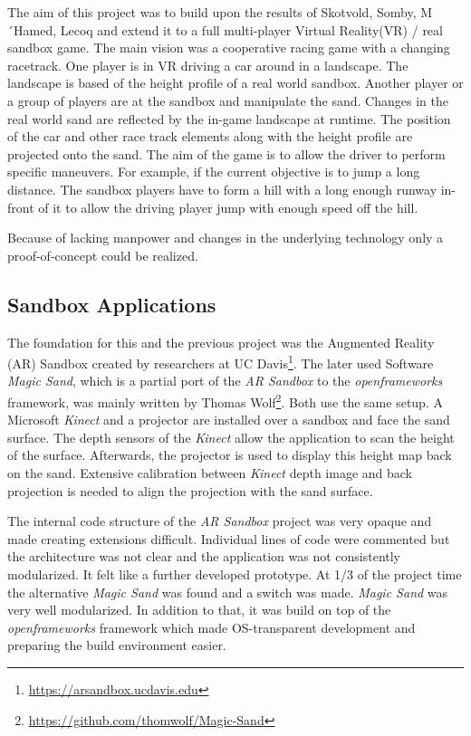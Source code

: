 \documentclass[12pt,a4paper,twoside,titlepage,headsepline,numbers=noenddot,listof=totoc,index=totoc,bibliography=totoc]{scrartcl}
\theoremstyle{break}
\begin{document}
The aim of this project was to build upon the results of Skotvold, Somby, M´Hamed, Lecoq and extend it to a full multi-player Virtual Reality(VR) / real sandbox game. The main vision was a cooperative racing game with a changing racetrack. One player is in VR driving a car around in a landscape. The landscape is based of the height profile of a real world sandbox. Another player or a group of players are at the sandbox and manipulate the sand. Changes in the real world sand are reflected by the in-game landscape at runtime. The position of the car and other race track elements along with the height profile are projected onto the sand. The aim of the game is to allow the driver to perform specific maneuvers. For example, if the current objective is to jump a long distance. The sandbox players have to form a hill with a long enough runway in-front of it to allow the driving player jump with enough speed off the hill.  

Because of lacking manpower and changes in the underlying technology only a proof-of-concept could be realized.

\subsection{Sandbox Applications}
The foundation for this and the previous project was the Augmented Reality (AR) Sandbox created by researchers at UC Davis\footnote{\url{https://arsandbox.ucdavis.edu}}. The later used Software \textit{Magic Sand}, which is a partial port of the \textit{AR Sandbox} to the \textit{openframeworks} framework, was mainly written by Thomas Wolf\footnote{\url{https://github.com/thomwolf/Magic-Sand}}. Both use the same setup. A Microsoft \textit{Kinect} and a projector are installed over a sandbox and face the sand surface. The depth sensors of the \textit{Kinect} allow the application to scan the height of the surface. Afterwards, the projector is used to display this height map back on the sand. Extensive calibration between \textit{Kinect} depth image and back projection is needed to align the projection with the sand surface. 

The internal code structure of the \textit{AR Sandbox} project was very opaque and made creating extensions difficult. Individual lines of code were commented but the architecture was not clear and the application was not consistently modularized. It felt like a further developed prototype. At 1/3 of the project time the alternative \textit{Magic Sand} was found and a switch was made. \textit{Magic Sand} was very well modularized. In addition to that, it was build on top of the \textit{openframeworks} framework which made OS-transparent development and preparing the build environment easier. 
\end{document}
